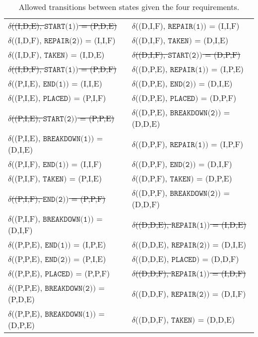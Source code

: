 \begin{table}
\begin{tabular}{ll}
    \sout{$\delta$((I,D,E), $\texttt{START(1)})$ = (P,D,E)}     & $\delta$((D,I,F), $\texttt{REPAIR(1)})$ = (I,I,F)     \\
    $\delta$((I,D,F), $\texttt{REPAIR(2)})$ = (I,I,F)    & $\delta$((D,I,F), $\texttt{TAKEN})$ = (D,I,E)         \\
    $\delta$((I,D,F), $\texttt{TAKEN})$ = (I,D,E)        & \sout{$\delta$((D,I,F), $\texttt{START(2)})$ = (D,P,F)}      \\
    \sout{$\delta$((I,D,F), $\texttt{START(1)})$ = (P,D,F)}     & $\delta$((D,P,E), $\texttt{REPAIR(1)})$ = (I,P,E)     \\
    $\delta$((P,I,E), $\texttt{END(1)})$ = (I,I,E)       & $\delta$((D,P,E), $\texttt{END(2)})$ = (D,I,E)        \\
    $\delta$((P,I,E), $\texttt{PLACED})$ = (P,I,F)       & $\delta$((D,P,E), $\texttt{PLACED})$ = (D,P,F)        \\
    \sout{$\delta$((P,I,E), $\texttt{START(2)})$ = (P,P,E)}     & $\delta$((D,P,E), $\texttt{BREAKDOWN(2)})$ = (D,D,E)  \\
    $\delta$((P,I,E), $\texttt{BREAKDOWN(1)})$ = (D,I,E) & $\delta$((D,P,F), $\texttt{REPAIR(1)})$ = (I,P,F)     \\
    $\delta$((P,I,F), $\texttt{END(1)})$ = (I,I,F)       & $\delta$((D,P,F), $\texttt{END(2)})$ = (D,I,F)        \\
    $\delta$((P,I,F), $\texttt{TAKEN})$ = (P,I,E)        & $\delta$((D,P,F), $\texttt{TAKEN})$ = (D,P,E)         \\
    \sout{$\delta$((P,I,F), $\texttt{END(2)})$ = (P,P,F)}       & $\delta$((D,P,F), $\texttt{BREAKDOWN(2)})$ = (D,D,F)  \\
    $\delta$((P,I,F), $\texttt{BREAKDOWN(1)})$ = (D,I,F) & \sout{$\delta$((D,D,E), $\texttt{REPAIR(1)})$ = (I,D,E)}     \\
    $\delta$((P,P,E), $\texttt{END(1)})$ = (I,P,E)       & $\delta$((D,D,E), $\texttt{REPAIR(2)})$ = (D,I,E)     \\
    $\delta$((P,P,E), $\texttt{END(2)})$ = (P,I,E)       & $\delta$((D,D,E), $\texttt{PLACED})$ = (D,D,F)        \\
    $\delta$((P,P,E), $\texttt{PLACED})$ = (P,P,F)       & \sout{$\delta$((D,D,F), $\texttt{REPAIR(1)})$ = (I,D,F)}     \\
    $\delta$((P,P,E), $\texttt{BREAKDOWN(2)})$ = (P,D,E) & $\delta$((D,D,F), $\texttt{REPAIR(2)})$ = (D,I,F)     \\
    $\delta$((P,P,E), $\texttt{BREAKDOWN(1)})$ = (D,P,E) & $\delta$((D,D,F), $\texttt{TAKEN})$ = (D,D,E)         \\
  \end{tabular}
  \caption{Allowed transitions between states given the four requirements.}
  \label{tbl:04.03_delta}
\end{table}
